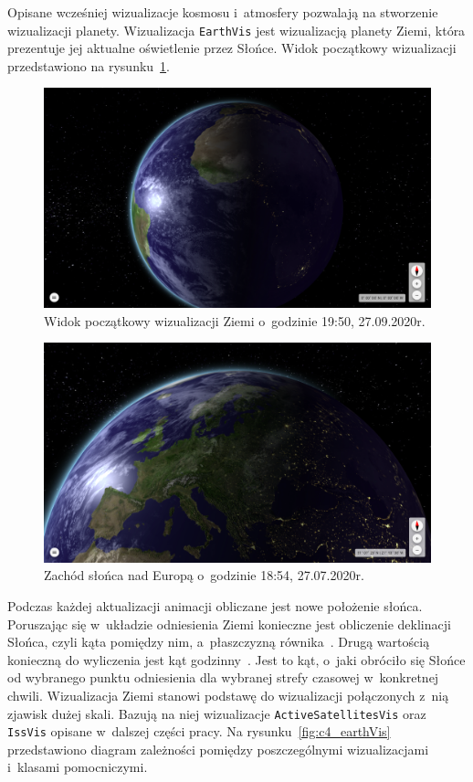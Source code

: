 Opisane wcześniej wizualizacje kosmosu i~atmosfery pozwalają na stworzenie wizualizacji planety. Wizualizacja \texttt{EarthVis} jest wizualizacją planety Ziemi, która prezentuje jej aktualne oświetlenie przez Słońce. Widok początkowy wizualizacji przedstawiono na rysunku~\ref{fig:c4_earthVis_1}. 


\begin{figure}[h]
  \centering
  \includegraphics[width=\linewidth]{img/c4_earthVis_1.png}
  \caption{Widok początkowy wizualizacji Ziemi o~godzinie 19:50, 27.09.2020r.}
  \label{fig:c4_earthVis_1} 
\end{figure}
  

\begin{figure}[h]
  \centering
  \includegraphics[width=\linewidth]{img/c4_earthVis_2.png}
  \caption{Zachód słońca nad Europą o~godzinie 18:54, 27.07.2020r.}
  \label{fig:c4_earthVis_2} 
\end{figure}
  
Podczas każdej aktualizacji animacji obliczane jest nowe położenie słońca. Poruszając się w~układzie odniesienia Ziemi konieczne jest obliczenie deklinacji Słońca, czyli kąta pomiędzy nim, a~płaszczyzną równika~\cite{Declination}. Drugą wartością konieczną do wyliczenia jest kąt godzinny~\cite{SolarTime}. Jest to kąt, o~jaki obróciło się Słońce od wybranego punktu odniesienia dla wybranej strefy czasowej w~konkretnej chwili. Wizualizacja Ziemi stanowi podstawę do wizualizacji połączonych z~nią zjawisk dużej skali. Bazują na niej wizualizacje \texttt{ActiveSatellitesVis} oraz \texttt{IssVis} opisane w~dalszej części pracy. Na rysunku~\ref{fig:c4_earthVis} przedstawiono diagram zależności pomiędzy poszczególnymi wizualizacjami i~klasami pomocniczymi.

